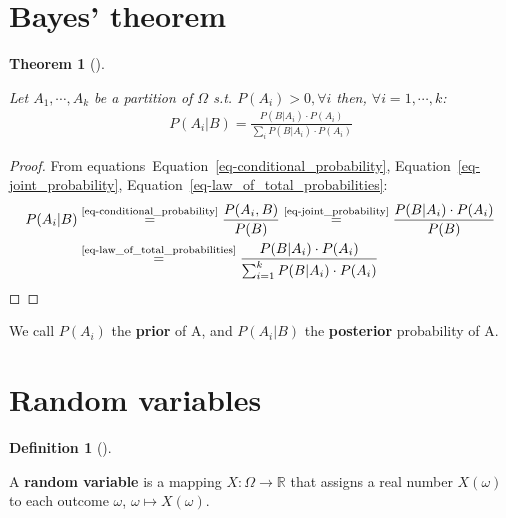\documentclass[
  letterpaper,
  12pt,
  british]{tufte-book}
\theoremstyle{plain}
\theoremstyle{definition}
\newtheorem{definition}{Definition}[chapter]
\theoremstyle{plain}
\newtheorem{theorem}{Theorem}[chapter]
\theoremstyle{remark}
\begin{document}
\hypertarget{sec-bayes_theorem}{%
\section{Bayes' theorem}\label{sec-bayes_theorem}}

\leavevmode{}%
\begin{theorem}[]\label{thm-bayes}

Let \(A_1, \cdots, A_k\) be a partition of \(\Omega\) s.t.
\(P(A_i)>0, \forall i\) then, \(\forall i=1, \cdots, k\): \begin{align}
        P(A_i|B)= \frac{P(B|A_i)\cdot P(A_i)}{\sum_i P(B|A_i)\cdot P(A_i)}
\end{align}

\end{theorem}

\begin{proof}

From
equations~Equation~\ref{eq-conditional_probability}, Equation~\ref{eq-joint_probability}, Equation~\ref{eq-law_of_total_probabilities}:
\begin{align}
        P(A_i|B)&\overset{\text{\ref{eq-conditional_probability}}}{=}\frac{P(A_i,B)}{P(B)} \overset{\text{\ref{eq-joint_probability}}}{=} \frac{P(B|A_i) \cdot P(A_i)}{P(B)}  \\
        &\overset{\text{\ref{eq-law_of_total_probabilities}}}{=}\frac{P(B|A_i)\cdot P(A_i)}{\sum_{i=1}^k P(B|A_i)\cdot P(A_i)}
\end{align} ◻

\end{proof}

We call \(P(A_i)\) the \textbf{prior} of A, and \(P(A_i|B)\) the
\textbf{posterior} probability of A.

\hypertarget{sec-random_variables}{%
\section{Random variables}\label{sec-random_variables}}

\leavevmode{}%
\begin{definition}[]\label{def-random_variable}

A \textbf{random variable} is a mapping
\(\mathit{X}:\Omega \to \mathbb{R}\) that assigns a real number
\(\mathit{X}(\omega)\) to each outcome \(\omega\),
\(\omega \mapsto \mathit{X}(\omega)\).

\end{definition}
\end{document}
